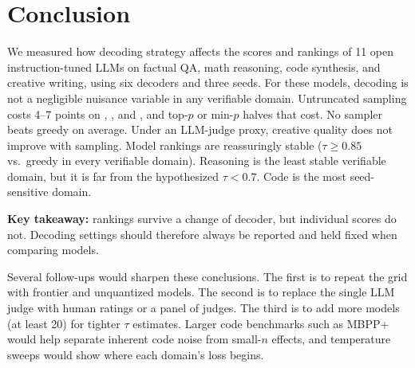 \section{Conclusion}
\label{sec:conclusion}

We measured how decoding strategy affects the scores and rankings of 11 open instruction-tuned LLMs on factual QA, math reasoning, code synthesis, and creative writing, using six decoders and three seeds. For these models, decoding is not a negligible nuisance variable in any verifiable domain. Untruncated sampling costs 4--7 points on \triviaqa, \gsm, and \humaneval, and top-$p$ or min-$p$ halves that cost. No sampler beats greedy on average. Under an LLM-judge proxy, creative quality does not improve with sampling. Model rankings are reassuringly stable ($\tau\geq0.85$ vs.\ greedy in every verifiable domain). Reasoning is the least stable verifiable domain, but it is far from the hypothesized $\tau<0.7$. Code is the most seed-sensitive domain.

{\bf Key takeaway:} rankings survive a change of decoder, but individual scores do not. Decoding settings should therefore always be reported and held fixed when comparing models.

Several follow-ups would sharpen these conclusions. The first is to repeat the grid with frontier and unquantized models. The second is to replace the single LLM judge with human ratings or a panel of judges. The third is to add more models (at least 20) for tighter $\tau$ estimates. Larger code benchmarks such as MBPP+~\citep{liu2023evalplus} would help separate inherent code noise from small-$n$ effects, and temperature sweeps would show where each domain's loss begins.

